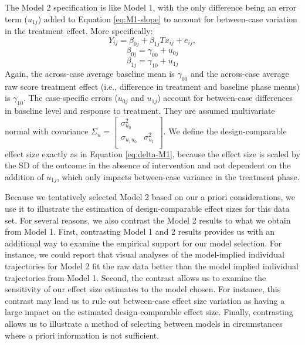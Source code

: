 \documentclass[
]{book}
\begin{document}
The Model 2 specification is like Model 1, with the only difference being an error term (\(u_{1j}\)) added to Equation \eqref{eq:M1-slope} to account for between-case variation in the treatment effect. More specifically:
\begin{equation}
\label{eq:M1M2-L1-repeat}
Y_{ij} = \beta_{0j} + \beta_{1j}Tx_{ij} + e_{ij},
\end{equation}
\begin{equation}
\label{eq:M2-intercept}
\beta_{0j} = \gamma_{00} + u_{0j}
\end{equation}
\begin{equation}
\label{eq:M2-slope}
\beta_{1j} = \gamma_{10} + u_{1j}
\end{equation}
Again, the across-case average baseline mean is \(\gamma_{00}\) and the across-case average raw score treatment effect (i.e., difference in treatment and baseline phase means) is \(\gamma_{10}\). The case-specific errors (\(u_{0j}\) and \(u_{1j}\)) account for between-case differences in baseline level and response to treatment. They are assumed multivariate normal with covariance
\(\Sigma_u = \begin{bmatrix} \sigma_{u_0}^2 & \\ \sigma_{u_1u_0} & \sigma_{u_1}^2 \\ \end{bmatrix}\).
We define the design-comparable effect size exactly as in Equation \eqref{eq:delta-M1},
because the effect size is scaled by the SD of the outcome in the absence of intervention and not dependent on the addition of \(u_{1j}\), which only impacts between-case variance in the treatment phase.

Because we tentatively selected Model 2 based on our a priori considerations, we use it to illustrate the estimation of design-comparable effect sizes for this data set. For several reasons, we also contrast the Model 2 results to what we obtain from Model 1. First, contrasting Model 1 and 2 results provides us with an additional way to examine the empirical support for our model selection. For instance, we could report that visual analyses of the model-implied individual trajectories for Model 2 fit the raw data better than the model implied individual trajectories from Model 1. Second, the contrast allows us to examine the sensitivity of our effect size estimates to the model chosen. For instance, this contrast may lead us to rule out between-case effect size variation as having a large impact on the estimated design-comparable effect size. Finally, contrasting allows us to illustrate a method of selecting between models in circumstances where a priori information is not sufficient.
\end{document}
